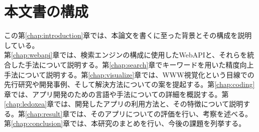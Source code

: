 \section{本文書の構成}
この第\ref{chap:introduction}章では、本論文を書くに至った背景とその構成を説明している。\\
第\ref{chap:webapi}章では、検索エンジンの構成に使用したWebAPIと、それらを統合した手法について説明する。第\ref{chap:search}章でキーワードを用いた精度向上手法について説明する。第\ref{chap:visualize}章では、WWW視覚化という目線での先行研究や開発事例、そして解決方法についての案を提起する。第\ref{chap:coding}章では、アプリ開発のための言語や手法についての詳細を概説する。第\ref{chap:ledoxea}章では、開発したアプリの利用方法と、その特徴について説明する。第\ref{chap:result}章では、そのアプリについての評価を行い、考察を述べる。第\ref{chap:conclusion}章では、本研究のまとめを行い、今後の課題を列挙する。